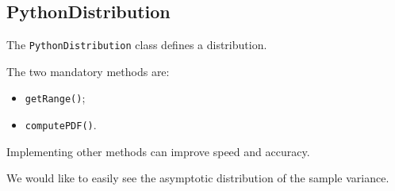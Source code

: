 \documentclass[11pt]{article}
\begin{document}
    \hypertarget{pythondistribution}{%
\subsection{PythonDistribution}\label{pythondistribution}}

The \texttt{PythonDistribution} class defines a distribution.

The two mandatory methods are:
\begin{itemize}
\item \texttt{getRange()};
\item \texttt{computePDF()}.
\end{itemize}

Implementing other methods can improve speed and accuracy.

    We would like to easily see the asymptotic distribution of the sample
variance.
\end{document}
